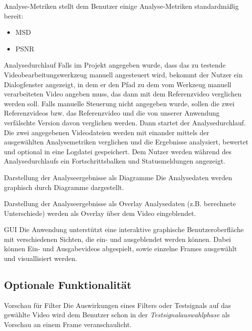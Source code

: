 Analyse-Metriken
\newline
\projektTitel stellt dem Benutzer einige Analyse-Metriken standardmäßig bereit:
\begin{itemize}
\item \gls{MSD}
\item \gls{PSNR}
\end{itemize}


 Analysedurchlauf
\newline
Falls im Projekt angegeben wurde, dass das zu testende Videobearbeitungswerkzeug manuell angesteuert wird, 
bekommt der Nutzer ein Dialogfenster angezeigt, in dem er den Pfad zu dem vom Werkzeug manuell verarbeiteten Video angeben muss, das dann mit dem Referenzvideo verglichen werden soll. Falls manuelle Steuerung nicht angegeben wurde, sollen die zwei Referenzvideos bzw. das Referenzvideo und die von unserer Anwendung verfälschte Version davon verglichen werden. Dann startet der Analysedurchlauf. Die zwei angegebenen Videodateien werden mit einander mittels der ausgewählten Analysemetriken verglichen und die Ergebnisse analysiert, bewertet und optional in eine Logdatei gespeichert. Dem Nutzer werden während des Analysedurchlaufs ein Fortschrittsbalken und Statusmeldungen angezeigt. 

 Darstellung der Analyseergebnisse als Diagramme
\newline
Die Analysedaten werden graphisch durch Diagramme dargestellt.

 Darstellung der Analyseergebnisse als Overlay
\newline
Analysedaten (z.B. berechnete Unterschiede) werden als Overlay über dem Video eingeblendet.


 GUI
\newline
Die Anwendung unterstützt eine interaktive graphische Benutzeroberfläche mit verschiedenen Sichten, die ein- und ausgeblendet werden können. Dabei können Ein- und Ausgabevideos abgespielt, sowie einzelne Frames ausgewählt und visuallisiert werden.





\subsection{Optionale Funktionalität}

 Vorschau für Filter
\newline
Die Auswirkungen eines Filters oder Testsignals auf das gewählte Video wird dem Benutzer schon in der \emph{Testsignalauswahlphase} als Vorschau an einem Frame veranschaulicht.


